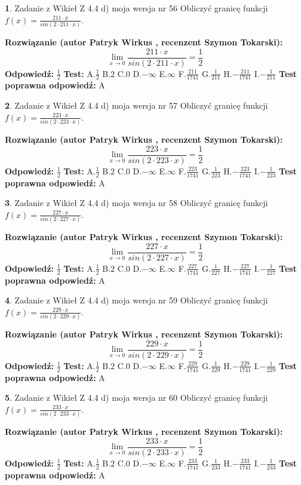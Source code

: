 \documentclass[12pt, a4paper]{article}
\theoremstyle{definition} %
\newtheorem{zad}{}
\newcommand{\zadStart}[1]{\begin{zad}#1\newline}
\newcommand{\zadStop}{\end{zad}}
\newcommand{\rozwStart}[2]{\noindent \textbf{Rozwiązanie (autor #1 , recenzent #2): }\newline}
\newcommand{\rozwStop}{\newline}
\newcommand{\odpStart}{\noindent \textbf{Odpowiedź:}\newline}
\newcommand{\odpStop}{\newline}
\newcommand{\testStart}{\noindent \textbf{Test:}\newline}
\newcommand{\testStop}{\newline}
\newcommand{\kluczStart}{\noindent \textbf{Test poprawna odpowiedź:}\newline}
\newcommand{\kluczStop}{\newline}
\begin{document}
\zadStart{Zadanie z Wikieł Z 4.4 d) moja wersja nr 56}
Obliczyć granicę funkcji $f(x)=\frac{211\cdot x}{sin(2 \cdot211\cdot x)}$.
\zadStop
\rozwStart{Patryk Wirkus}{Szymon Tokarski}
$$\lim\limits_{x\to 0}\frac{211\cdot x}{sin(2 \cdot211\cdot x)}=\frac{1}{2}$$
\rozwStop
\odpStart
$\frac{1}{2}$
\odpStop
\testStart
A.$\frac{1}{2}$
B.$2$
C.$0$
D.$-\infty$
E.$\infty$
F.$\frac{211}{1741}$
G.$\frac{1}{211}$
H.$-\frac{211}{1741}$
I.$-\frac{1}{211}$
\testStop
\kluczStart
A
\kluczStop



\zadStart{Zadanie z Wikieł Z 4.4 d) moja wersja nr 57}
Obliczyć granicę funkcji $f(x)=\frac{223\cdot x}{sin(2 \cdot223\cdot x)}$.
\zadStop
\rozwStart{Patryk Wirkus}{Szymon Tokarski}
$$\lim\limits_{x\to 0}\frac{223\cdot x}{sin(2 \cdot223\cdot x)}=\frac{1}{2}$$
\rozwStop
\odpStart
$\frac{1}{2}$
\odpStop
\testStart
A.$\frac{1}{2}$
B.$2$
C.$0$
D.$-\infty$
E.$\infty$
F.$\frac{223}{1741}$
G.$\frac{1}{223}$
H.$-\frac{223}{1741}$
I.$-\frac{1}{223}$
\testStop
\kluczStart
A
\kluczStop



\zadStart{Zadanie z Wikieł Z 4.4 d) moja wersja nr 58}
Obliczyć granicę funkcji $f(x)=\frac{227\cdot x}{sin(2 \cdot227\cdot x)}$.
\zadStop
\rozwStart{Patryk Wirkus}{Szymon Tokarski}
$$\lim\limits_{x\to 0}\frac{227\cdot x}{sin(2 \cdot227\cdot x)}=\frac{1}{2}$$
\rozwStop
\odpStart
$\frac{1}{2}$
\odpStop
\testStart
A.$\frac{1}{2}$
B.$2$
C.$0$
D.$-\infty$
E.$\infty$
F.$\frac{227}{1741}$
G.$\frac{1}{227}$
H.$-\frac{227}{1741}$
I.$-\frac{1}{227}$
\testStop
\kluczStart
A
\kluczStop



\zadStart{Zadanie z Wikieł Z 4.4 d) moja wersja nr 59}
Obliczyć granicę funkcji $f(x)=\frac{229\cdot x}{sin(2 \cdot229\cdot x)}$.
\zadStop
\rozwStart{Patryk Wirkus}{Szymon Tokarski}
$$\lim\limits_{x\to 0}\frac{229\cdot x}{sin(2 \cdot229\cdot x)}=\frac{1}{2}$$
\rozwStop
\odpStart
$\frac{1}{2}$
\odpStop
\testStart
A.$\frac{1}{2}$
B.$2$
C.$0$
D.$-\infty$
E.$\infty$
F.$\frac{229}{1741}$
G.$\frac{1}{229}$
H.$-\frac{229}{1741}$
I.$-\frac{1}{229}$
\testStop
\kluczStart
A
\kluczStop



\zadStart{Zadanie z Wikieł Z 4.4 d) moja wersja nr 60}
Obliczyć granicę funkcji $f(x)=\frac{233\cdot x}{sin(2 \cdot233\cdot x)}$.
\zadStop
\rozwStart{Patryk Wirkus}{Szymon Tokarski}
$$\lim\limits_{x\to 0}\frac{233\cdot x}{sin(2 \cdot233\cdot x)}=\frac{1}{2}$$
\rozwStop
\odpStart
$\frac{1}{2}$
\odpStop
\testStart
A.$\frac{1}{2}$
B.$2$
C.$0$
D.$-\infty$
E.$\infty$
F.$\frac{233}{1741}$
G.$\frac{1}{233}$
H.$-\frac{233}{1741}$
I.$-\frac{1}{233}$
\testStop
\kluczStart
A
\kluczStop
\end{document}
